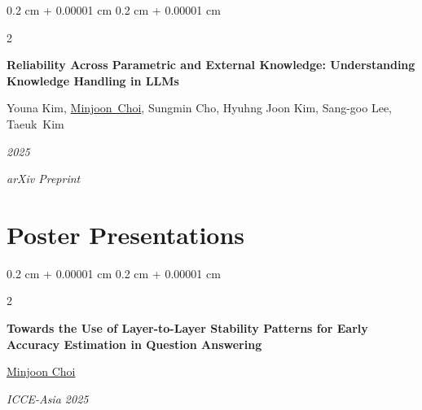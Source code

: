 \documentclass[10pt, letterpaper]{article}
\newenvironment{highlights}{
    \begin{itemize}[
        topsep=0.10 cm,
        parsep=0.10 cm,
        partopsep=0pt,
        itemsep=0pt,
        leftmargin=0.4 cm + 10pt
    ]
}{
    \end{itemize}
} %
\newenvironment{onecolentry}{
    \begin{adjustwidth}{
        0.2 cm + 0.00001 cm
    }{
        0.2 cm + 0.00001 cm
    }
}{
    \end{adjustwidth}
} %
\newenvironment{twocolentry}[2][]{
    \onecolentry
    \def\secondColumn{#2}
    \setcolumnwidth{\fill, 4.5 cm}
    \begin{paracol}{2}
}{
    \switchcolumn \raggedleft \secondColumn
    \end{paracol}
    \endonecolentry
} %
\let\hrefWithoutArrow\href
\renewcommand{\href}[2]{\hrefWithoutArrow{#1}{\ifthenelse{\equal{#2}{}}{ }{#2 }\raisebox{.15ex}{\footnotesize \faExternalLink*}}}
\begin{document}
        \vspace{0.3 cm}

        \begin{twocolentry}{
        \textit{2025}    
            
        \textit{arXiv Preprint}}
            \textbf{Reliability Across Parametric and External Knowledge: Understanding Knowledge Handling in LLMs}

            \vspace{0.10 cm}

            Youna Kim, \mbox{\underline{Minjoon Choi}}, Sungmin Cho, Hyuhng Joon Kim, Sang-goo Lee, \mbox{Taeuk Kim}
        \end{twocolentry}


    
    \section{Poster Presentations}
        \begin{twocolentry}{
        \textit{ICCE-Asia 2025}}
            \textbf{Towards the Use of Layer-to-Layer Stability Patterns for Early Accuracy Estimation in Question Answering}

            \vspace{0.10 cm}

            \underline{Minjoon Choi}
        \end{twocolentry}




\end{document}
